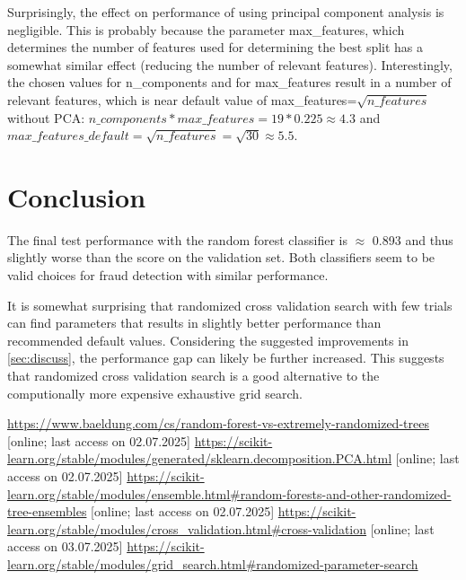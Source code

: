 \documentclass[a4, 10 pt, conference]{ieeeconf}  %
\begin{document}
Surprisingly, the effect on performance of using principal component analysis is negligible. This is probably because the parameter max\_features, which determines the number of features used for determining the best split has a somewhat similar effect (reducing the number of relevant features). Interestingly, the chosen values for n\_components and for max\_features result in a number of relevant features, which is near default value of max\_features=$\sqrt{n\_features}$ \cite{sl.rf} without PCA: $n\_components*max\_features = 19*0.225 \approx 4.3$ and $max\_features\_default=\sqrt{n\_features}=\sqrt{30}\approx 5.5$.

\section{Conclusion}
\label{sec:con}
The final test performance with the random forest classifier is $\approx$ 0.893 and thus slightly worse than the score on the validation set. Both classifiers seem to be valid choices for fraud detection with similar performance.

It is somewhat surprising that randomized cross validation search with few trials can find parameters that results in slightly better performance than recommended default values. Considering the suggested improvements in \ref{sec:discuss}, the performance gap can likely be further increased. This suggests that randomized cross validation search is a good alternative to the computionally more expensive exhaustive grid search.

\begin{thebibliography}{xxxx}
	 \url{https://www.baeldung.com/cs/random-forest-vs-extremely-randomized-trees} [online; last access on 02.07.2025]
	 \url{https://scikit-learn.org/stable/modules/generated/sklearn.decomposition.PCA.html} [online; last access on 02.07.2025]
	 \url{https://scikit-learn.org/stable/modules/ensemble.html#random-forests-and-other-randomized-tree-ensembles} [online; last access on 02.07.2025]
	 \url{https://scikit-learn.org/stable/modules/cross_validation.html#cross-validation} [online; last access on 03.07.2025]
	 \url{https://scikit-learn.org/stable/modules/grid_search.html#randomized-parameter-search}
\end{thebibliography}
\end{document}
